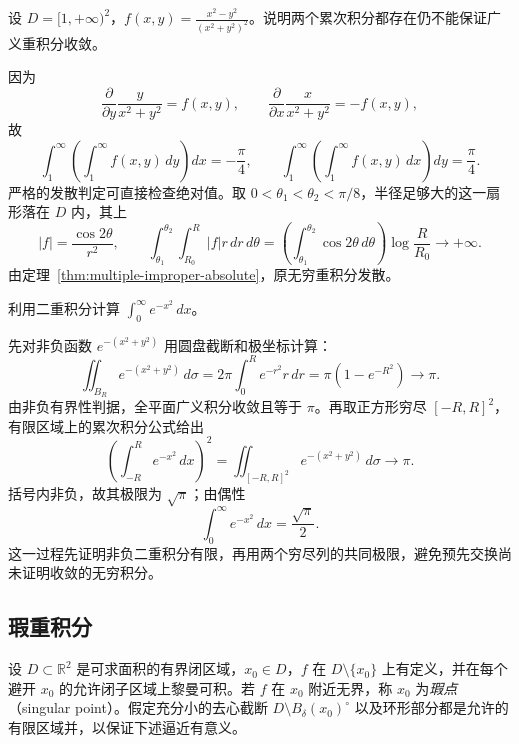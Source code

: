 \begin{example}
\label{ex:multiple-two-iterates-divergent}
设 $D=[1,+\infty)^2$，$\displaystyle f(x,y)=\frac{x^2-y^2}{(x^2+y^2)^2}$。说明两个累次积分都存在仍不能保证广义重积分收敛。
\end{example}
\begin{solve}
因为
\[
    \frac{\partial}{\partial y}\frac{y}{x^2+y^2}=f(x,y),
    \qquad
    \frac{\partial}{\partial x}\frac{x}{x^2+y^2}=-f(x,y),
\]
故
\[
    \int_1^\infty\left(\int_1^\infty f(x,y)\,dy\right)dx=-\frac\pi4,
    \qquad
    \int_1^\infty\left(\int_1^\infty f(x,y)\,dx\right)dy=\frac\pi4.
\]
严格的发散判定可直接检查绝对值。取 $0<\theta_1<\theta_2<\pi/8$，半径足够大的这一扇形落在 $D$ 内，其上
\[
    |f|=\frac{\cos2\theta}{r^2},\qquad
    \int_{\theta_1}^{\theta_2}\int_{R_0}^R|f|r\,dr\,d\theta
    =\left(\int_{\theta_1}^{\theta_2}\cos2\theta\,d\theta\right)\log\frac R{R_0}\to+\infty.
\]
由定理~\ref{thm:multiple-improper-absolute}，原无穷重积分发散。
\end{solve}

\begin{example}
\label{ex:multiple-gaussian-integral}
利用二重积分计算 $\displaystyle\int_0^\infty e^{-x^2}\,dx$。
\end{example}
\begin{solve}
先对非负函数 $e^{-(x^2+y^2)}$ 用圆盘截断和极坐标计算：
\[
    \iint_{B_R}e^{-(x^2+y^2)}\,d\sigma
    =2\pi\int_0^Re^{-r^2}r\,dr
    =\pi(1-e^{-R^2})\to\pi.
\]
由非负有界性判据，全平面广义积分收敛且等于 $\pi$。再取正方形穷尽 $[-R,R]^2$，有限区域上的累次积分公式给出
\[
    \left(\int_{-R}^Re^{-x^2}\,dx\right)^2
    =\iint_{[-R,R]^2}e^{-(x^2+y^2)}\,d\sigma\to\pi.
\]
括号内非负，故其极限为 $\sqrt\pi$；由偶性
\[
    \int_0^\infty e^{-x^2}\,dx=\frac{\sqrt\pi}{2}.
\]
这一过程先证明非负二重积分有限，再用两个穷尽列的共同极限，避免预先交换尚未证明收敛的无穷积分。
\end{solve}

\subsection{瑕重积分}
\label{subsec:singular-multiple-integrals}

设 $D\subset\mathbb R^2$ 是可求面积的有界闭区域，$x_0\in D$，$f$ 在 $D\setminus\{x_0\}$ 上有定义，并在每个避开 $x_0$ 的允许闭子区域上黎曼可积。若 $f$ 在 $x_0$ 附近无界，称 $x_0$ 为\emph{瑕点}（singular point）。假定充分小的去心截断 $D\setminus B_\delta(x_0)^\circ$ 以及环形部分都是允许的有限区域并，以保证下述逼近有意义。

